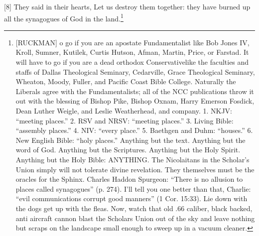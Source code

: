 [8] \textcolor[rgb]{0.00,0.00,1.00}{They said in their hearts, Let us destroy them together: they have burned up all the synagogues of God in the land.}\footnote{[RUCKMAN] o go if you are an apostate Fundamentalist like Bob Jones IV, Kroll, Sumner, Kutilek, Curtis Hutson, Afman, Martin, Price, or Farstad. It will have  to go if you are a dead orthodox Conservativelike the faculties and staffs of Dallas Theological Seminary, Cedarville, Grace Theological Seminary, Wheaton, Moody, Fuller, and Pacific Coast Bible College. Naturally the Liberals agree with the Fundamentalists; all of the NCC publications throw it out with the blessing of Bishop Pike, Bishop Oxnam, Harry Emerson Fosdick, Dean Luther Weigle, and Leslie Weatherhead, and company. 1. NKJV: “meeting places.” 2. RSV and NRSV: “meeting places.” 3. Living Bible: “assembly places.” 4. NIV: “every place.” 5. Baethgen and Duhm: “houses.” 6. New English Bible: “holy places.” Anything but the text. Anything but the word of God. Anything but the Scriptures. Anything but the Holy Spirit. Anything but the Holy Bible: ANYTHING. The Nicolaitans in the Scholar’s Union simply will not tolerate divine revelation. They themselves must be the oracles for the Sphinx. Charles Haddon Spurgeon: “There is no allusion to places called synagogues” (p. 274). I’ll tell you one better than that, Charlie: “evil communications corrupt good manners” (1 Cor. 15:33). Lie down with the dogs get up with the fleas. Now, watch that old .66 caliber, black backed, anti aircraft cannon blast the Scholars Union out of the sky and leave nothing but scraps on the landscape small enough to sweep up in a vacuum cleaner.\cite{Ruckman1992Psalms}}

